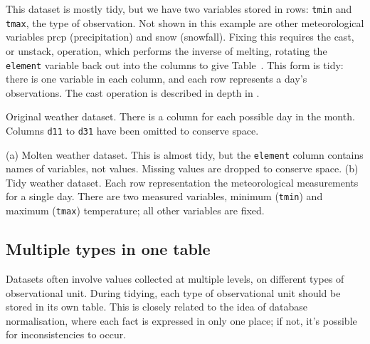 \documentclass[article]{jss}
\begin{document}
This dataset is mostly tidy, but we have two variables stored in rows: {\tt tmin} and {\tt tmax}, the type of observation. Not shown in this example are other meteorological variables prcp (precipitation) and snow (snowfall). Fixing this requires the cast, or unstack, operation, which performs the inverse of melting, rotating the {\tt element} variable back out into the columns to give Table~. This form is tidy: there is one variable in each column, and each row represents a day's observations. The cast operation is described in depth in \citet{wickham:2007b}.

\begin{table}[htbp]
  \centering
  
  \caption{Original weather dataset.  There is a column for each possible day in the month.  Columns {\tt d11} to {\tt d31} have been omitted to conserve space.}
  \label{tbl:weather-raw}
\end{table}

\begin{table}[htbp]
  \centering
  \hspace{2em}%

  \caption{(a) Molten weather dataset.  This is almost tidy, but the {\tt element} column contains names of variables, not values. Missing values are dropped to conserve space. (b) Tidy weather dataset. Each row representation the meteorological measurements for a single day.  There are two measured variables, minimum ({\tt tmin}) and maximum ({\tt tmax}) temperature; all other variables are fixed.}
  \label{tbl:weather-clean}
\end{table}

\subsection{Multiple types in one table}
\label{sub:multiple-types}

Datasets often involve values collected at multiple levels, on different types of observational unit. During tidying, each type of observational unit should be stored in its own table. This is closely related to the idea of database normalisation, where each fact is expressed in only one place; if not, it's possible for inconsistencies to occur. 

\end{document}
